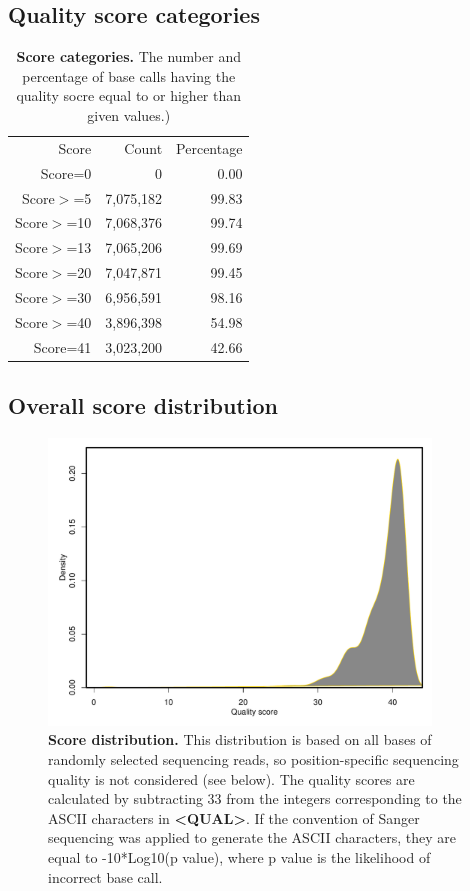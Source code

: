 \documentclass{article}
\begin{document}
\subsection{Quality score categories}
\begin{table}
\begin{tabular}{|r|r|r|}
  \hline
Score & Count & Percentage \\ 
  \rowcolor[gray]{0.9} \hline
Score=0 &         0 &  0.00 \\ 
  Score$>$=5 & 7,075,182 & 99.83 \\ 
   \rowcolor[gray]{0.9}Score$>$=10 & 7,068,376 & 99.74 \\ 
  Score$>$=13 & 7,065,206 & 99.69 \\ 
   \rowcolor[gray]{0.9}Score$>$=20 & 7,047,871 & 99.45 \\ 
  Score$>$=30 & 6,956,591 & 98.16 \\ 
   \rowcolor[gray]{0.9}Score$>$=40 & 3,896,398 & 54.98 \\ 
  Score=41 & 3,023,200 & 42.66 \\ 
   \hline
\end{tabular}\caption{\textbf{Score categories.} The number and percentage of base calls having the quality socre equal to or higher than given values.)}
\end{table}

\subsection{Overall score distribution}

\begin{center}
\begin{figure}
\includegraphics[width=4in, height=3in]{bamchop-qual-distribution}
\caption{\textbf{Score distribution.} This distribution is based on all bases of randomly selected sequencing reads, so position-specific sequencing quality is not considered (see below). The quality scores are calculated by subtracting 33 from the integers corresponding to the ASCII characters in \textbf{<QUAL>}. If the convention of Sanger sequencing was applied to generate the ASCII characters, they are equal to -10*Log10(p value), where p value is the likelihood of incorrect base call.}
\end{figure}
\end{center}
\end{document}
